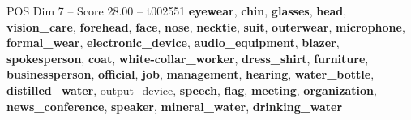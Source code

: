 \begin{textsample}{POS Dim 7 – Score 28.00 – t002551}  \label{ex:f7_pos_020}
\textbf{eyewear}, \textbf{chin}, \textbf{glasses}, \textbf{head}, \textbf{vision\_care}, \textbf{forehead}, \textbf{face}, \textbf{nose}, \textbf{necktie}, \textbf{suit}, \textbf{outerwear}, \textbf{microphone}, \textbf{formal\_wear}, \textbf{electronic\_device}, \textbf{audio\_equipment}, \textbf{blazer}, \textbf{spokesperson}, \textbf{coat}, \textbf{white-collar\_worker}, \textbf{dress\_shirt}, \textbf{furniture}, \textbf{businessperson}, \textbf{official}, \textbf{job}, \textbf{management}, \textbf{hearing}, \textbf{water\_bottle}, \textbf{distilled\_water}, output\_device, \textbf{speech}, \textbf{flag}, \textbf{meeting}, \textbf{organization}, \textbf{news\_conference}, \textbf{speaker}, \textbf{mineral\_water}, \textbf{drinking\_water}

\end{textsample}
